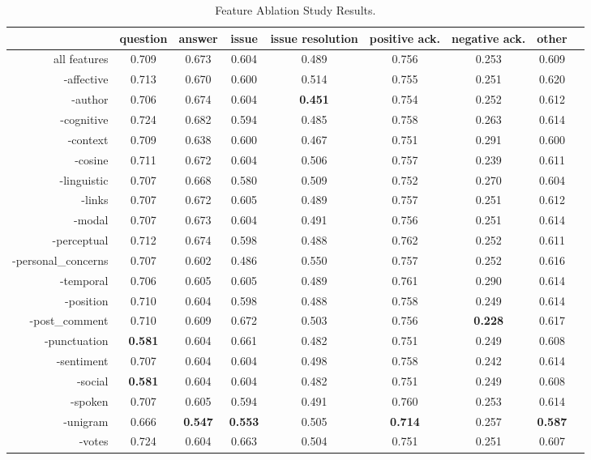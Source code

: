 \documentclass[twoside]{article}
\begin{document}
\begin{table}[t]
  \centering
  {\footnotesize
    \begin{tabular*}{\textwidth}{rcccccccc}
          & \multicolumn{1}{c}{question} & \multicolumn{1}{c}{answer} & \multicolumn{1}{c}{issue} & \multicolumn{1}{c}{issue resolution} & \multicolumn{1}{c}{positive ack.} & \multicolumn{1}{c}{negative ack.} & \multicolumn{1}{c}{other} \\ \hline
    all features  & \multicolumn{1}{c}{0.709} & \multicolumn{1}{c}{0.673} & \multicolumn{1}{c}{0.604} & \multicolumn{1}{c}{0.489} & \multicolumn{1}{c}{0.756} & \multicolumn{1}{c}{0.253} & \multicolumn{1}{c}{0.609} \\\hline
    -affective & 0.713 & 0.670 & 0.600 & 0.514 & 0.755 & 0.251 & 0.620  \\
    -author & 0.706 & 0.674 & 0.604 &  \textbf{0.451} & 0.754 &  0.252 & 0.612 \\
    -cognitive & 0.724 & 0.682 & 0.594 & 0.485 & 0.758 & 0.263 & 0.614  \\
    -context & 0.709 & 0.638 & 0.600 & 0.467 & 0.751 & 0.291 & 0.600 \\
    -cosine & 0.711 & 0.672 & 0.604 & 0.506 & 0.757 & 0.239 & 0.611  \\
    -linguistic & 0.707 & 0.668 & 0.580 & 0.509 & 0.752 & 0.270 & 0.604 \\
    -links & 0.707 & 0.672 & 0.605 & 0.489 & 0.757 & 0.251 & 0.612  \\
    -modal & 0.707 & 0.673 & 0.604 & 0.491 & 0.756 & 0.251 & 0.614 \\
    -perceptual & 0.712 & 0.674 & 0.598 & 0.488 & 0.762 & 0.252 & 0.611 \\
    -personal\_concerns & 0.707 & 0.602 & 0.486 & 0.550 & 0.757 & 0.252 & 0.616  \\
    -temporal & 0.706 & 0.605 & 0.605 &  0.489 & 0.761 & 0.290 & 0.614  \\    
    -position & 0.710 & 0.604 & 0.598 & 0.488 & 0.758 & 0.249 & 0.614 \\
    -post\_comment & 0.710 & 0.609 & 0.672 & 0.503 & 0.756 & \textbf{0.228} & 0.617 \\
    -punctuation &  \textbf{0.581} & 0.604 & 0.661 & 0.482 & 0.751  & 0.249 & 0.608 \\
    -sentiment & 0.707 & 0.604 & 0.604 & 0.498 & 0.758 & 0.242  & 0.614 \\
    -social & \textbf{0.581} & 0.604 & 0.604 & 0.482 & 0.751 & 0.249 & 0.608 \\
    -spoken & 0.707 & 0.605 & 0.594 & 0.491 & 0.760 & 0.253 & 0.614  \\
    -unigram & 0.666 & \textbf{0.547} & \textbf{0.553} &  0.505 & \textbf{0.714} &  0.257 & \textbf{0.587}  \\
    -votes & 0.724 & 0.604 & 0.663 & 0.504 & 0.751 & 0.251 & 0.607 \\\hline
\end{tabular*} }
  \caption{Feature Ablation Study Results.}    
  \vspace{-15pt}  
  \label{tab:results}
\end{table}
\end{document}
